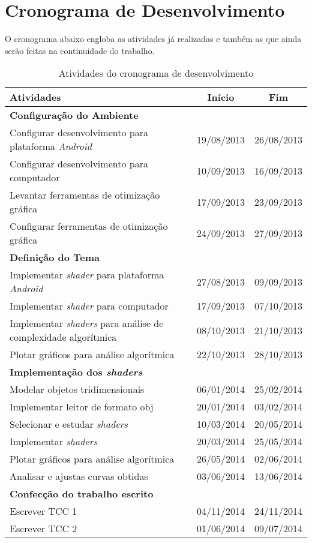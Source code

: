 \chapter[Cronograma de Desenvolvimento]{Cronograma de Desenvolvimento}

	O cronograma abaixo engloba as atividades já realizadas e também as que ainda serão feitas na continuidade do trabalho. 

	\begin{table}[h]
	\centering	
	\begin{tabularx}{0.9\textwidth}{Xcc}
		\toprule
		\textbf{Atividades} & \textbf{Início} & \textbf{Fim}   \\
		\toprule
		\textbf{Configuração do Ambiente} & &    \\
		\midrule
		Configurar desenvolvimento para plataforma \textit{Android} & 19/08/2013 & 26/08/2013  \\
		Configurar desenvolvimento para computador & 10/09/2013 & 16/09/2013 \\
		Levantar ferramentas de otimização gráfica & 17/09/2013 & 23/09/2013 \\
		Configurar ferramentas de otimização gráfica & 24/09/2013 & 27/09/2013 \\
		\toprule
		\textbf{Definição do Tema} &  &    \\
		\midrule
		Implementar \textit{shader} para plataforma \textit{Android} & 27/08/2013 & 09/09/2013  \\
		Implementar \textit{shader} para computador & 17/09/2013 & 07/10/2013 \\
		Implementar \textit{shaders} para análise de complexidade algorítmica & 08/10/2013 & 21/10/2013 \\
		Plotar gráficos para análise algorítmica & 22/10/2013 & 28/10/2013 \\
		\toprule
		\textbf{Implementação dos \textit{shaders}} &  &   \\
		\midrule
		Modelar objetos tridimensionais & 06/01/2014 & 25/02/2014  \\
		Implementar leitor de formato obj & 20/01/2014 & 03/02/2014 \\
		Selecionar e estudar \textit{shaders} & 10/03/2014 & 20/05/2014 \\
		Implementar \textit{shaders} & 20/03/2014 & 25/05/2014 \\
		Plotar gráficos para análise algorítmica & 26/05/2014 & 02/06/2014 \\
		Analisar e ajustas curvas obtidas & 03/06/2014 & 13/06/2014 \\
		\toprule
		\textbf{Confecção do trabalho escrito} &  &   \\
		\midrule
		Escrever TCC 1 & 04/11/2014 & 24/11/2014 \\
		Escrever TCC 2 & 01/06/2014 & 09/07/2014 \\
		\midrule
	\end{tabularx}
	\caption{ Atividades do cronograma de desenvolvimento}
	\label{bufferdata}
\end{table}



